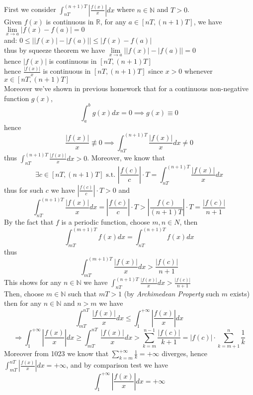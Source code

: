 \documentclass{article}
\def\R{\mathbb{R}}
\def\N{\mathbb{N}}
\def\to{\rightarrow}
\def\imply{\Longrightarrow}
\def\oo{\infty}
\def\st{\text{ s.t. } }
\begin{document}
\section{}
First we consider $\int_{nT}^{(n+1)T}\left|\frac{f(x)}{x}\right| dx$ where $n\in \N$ and $T>0$.\\
Given $f(x)$ is continuous in $\R$, for any $a\in [nT, (n+1)T]$, we have $\lim\limits_{x\to a}\left|f(x)-f(a)\right|=0$\\
and: $0\le \left| |f(x)|-|f(a)|\right| \le \left|f(x)-f(a)\right|$\\
thus by squeeze theorem we have $\lim\limits_{x\to a}\left| |f(x)|-|f(a)|\right|=0$\\
hence $|f(x)|$ is continuous in $[nT, (n+1)T]$\\
hence $\frac{|f(x)|}{x}$ is continuous in $[nT, (n+1)T]$ since $x>0$ whenever $x\in [nT, (n+1)T]$\\
Moreover we've shown in previous homework that for a continuous non-negative function $g(x)$,
$$\int_{a}^{b}g(x)dx=0 \implies g(x) \equiv 0 $$
hence 
$$\frac{|f(x)|}{x} \not\equiv 0 \implies \int_{nT}^{(n+1)T}\frac{|f(x)|}{x}dx\neq 0$$
thus $\int_{nT}^{(n+1)T}\frac{|f(x)|}{x}dx >0 $.  
Moreover, we know that 
$$\exists c\in [nT, (n+1)T] \st \left|\frac{f(c)}{c}\right|\cdot T = \int_{nT}^{(n+1)T}\frac{|f(x)|}{x}dx $$
thus for such $c$ we have $\left|\frac{f(c)}{c}\right|\cdot T >0$ and 
$$\int_{nT}^{(n+1)T}\frac{|f(x)|}{x}dx=\left|\frac{f(c)}{c}\right|\cdot T > \left|\frac{f(c)}{(n+1)T}\right| \cdot T=\frac{|f(c)|}{n+1}$$
By the fact that $f$ is a periodic function, choose $m, n\in N$, then 
$$\int_{mT}^{(m+1)T}f(x)dx=\int_{nT}^{(n+1)T}f(x)dx$$
thus
$$\int_{mT}^{(m+1)T}\frac{|f(x)|}{x}dx > \frac{|f(c)|}{n+1}$$
This shows for any $n\in \N$ we have $\int_{nT}^{(n+1)T}\frac{|f(x)|}{x}dx > \frac{|f(c)|}{n+1}$\\
Then, choose $m\in \N$ such that $mT>1$ (by \textit{Archimedean Property} such $m$ exists)\\
then for any $n\in \N$ and $n>m$ we have
$$\int_{mT}^{nT}\frac{|f(x)|}{x}dx \le  \int_{1}^{+\oo}\left|\frac{f(x)}{x}\right|dx$$
$$\imply \int_{1}^{+\oo}\left|\frac{f(x)}{x}\right|dx \ge \int_{mT}^{nT}\frac{|f(x)|}{x}dx > \sum_{k=m}^{n-1}\frac{|f(c)|}{k+1}=|f(c)|\cdot \sum_{k=m+1}^{n}\frac{1}{k} $$
Moreover from 1023 we know that $\sum_{k=m}^{+\oo}\frac{1}{k}=+\oo$ diverges, hence $\int_{mT}^{nT}\left|\frac{f(x)}{x}\right| dx=+\oo$, and by comparison test we have
$$\int_{1}^{+\oo}\left|\frac{f(x)}{x}\right|dx=+\oo$$

\section{}
\end{document}
